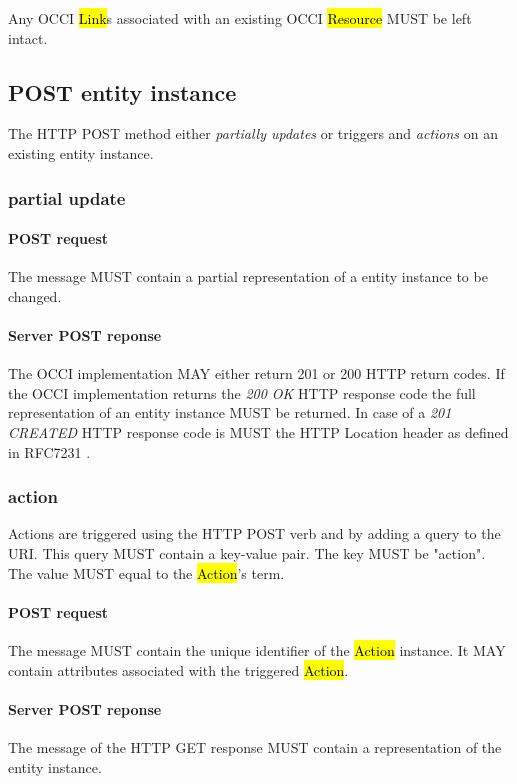 \documentclass[10pt,a4paper]{article}
\begin{document}
Any OCCI \hl{Link}s associated with an existing OCCI \hl{Resource} MUST be left intact.

\subsection{POST entity instance}
The HTTP POST method either {\em partially updates} or triggers and {\em actions} on an existing entity instance.

\subsubsection{partial update}

\paragraph{POST request}
The message MUST contain a partial representation of a entity instance to be changed.

\paragraph{Server POST reponse}
The OCCI implementation MAY either return 201 or 200 HTTP return codes. If the OCCI implementation
returns the \emph{200 OK} HTTP response code the full representation of an entity instance MUST be returned. 
In case of a \emph{201 CREATED} HTTP response code is MUST the HTTP Location header as defined in RFC7231 \cite{rfc7231}.

\subsubsection{action}
Actions are triggered using the HTTP POST verb and by adding a query to the URI. This query MUST contain a key-value pair. The key MUST be "action". The value MUST equal to the \hl{Action}'s term.

\paragraph{POST request}
The message MUST contain the unique identifier of the \hl{Action} instance. It MAY contain attributes associated with the triggered \hl{Action}.

\paragraph{Server POST reponse}
The message of the HTTP GET response MUST contain a representation of the entity instance.
\end{document}
